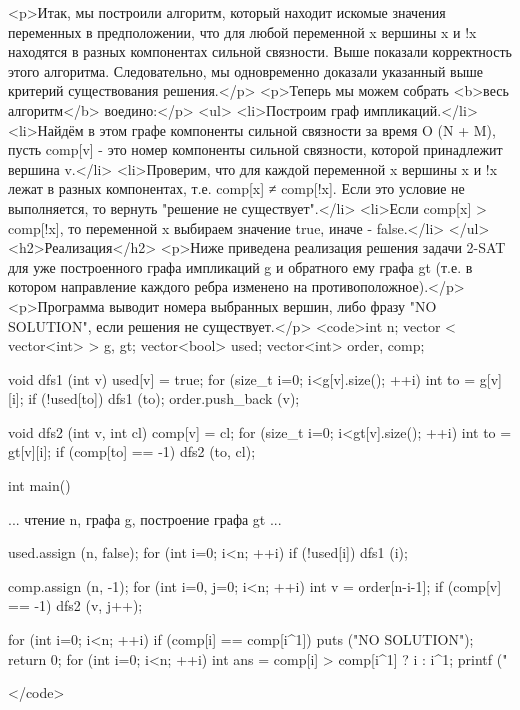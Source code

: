 <p>Итак, мы построили алгоритм, который находит искомые значения переменных в предположении, что для любой переменной x вершины x и !x находятся в разных компонентах сильной связности. Выше показали корректность этого алгоритма. Следовательно, мы одновременно доказали указанный выше критерий существования решения.</p>
<p>Теперь мы можем собрать <b>весь алгоритм</b> воедино:</p>
<ul>
<li>Построим граф импликаций.</li>
<li>Найдём в этом графе компоненты сильной связности за время O (N + M), пусть comp[v] - это номер компоненты сильной связности, которой принадлежит вершина v.</li>
<li>Проверим, что для каждой переменной x вершины x и !x лежат в разных компонентах, т.е. comp[x] ≠ comp[!x]. Если это условие не выполняется, то вернуть "решение не существует".</li>
<li>Если comp[x] > comp[!x], то переменной x выбираем значение true, иначе - false.</li>
</ul>
<h2>Реализация</h2>
<p>Ниже приведена реализация решения задачи 2-SAT для уже построенного графа импликаций g и обратного ему графа gt (т.е. в котором направление каждого ребра изменено на противоположное).</p>
<p>Программа выводит номера выбранных вершин, либо фразу "NO SOLUTION", если решения не существует.</p>
<code>int n;
vector < vector<int> > g, gt;
vector<bool> used;
vector<int> order, comp;

void dfs1 (int v) {
	used[v] = true;
	for (size_t i=0; i<g[v].size(); ++i) {
		int to = g[v][i];
		if (!used[to])
			dfs1 (to);
	}
	order.push_back (v);
}

void dfs2 (int v, int cl) {
	comp[v] = cl;
	for (size_t i=0; i<gt[v].size(); ++i) {
		int to = gt[v][i];
		if (comp[to] == -1)
			dfs2 (to, cl);
	}
}

int main() {
	... чтение n, графа g, построение графа gt ...

	used.assign (n, false);
	for (int i=0; i<n; ++i)
		if (!used[i])
			dfs1 (i);

	comp.assign (n, -1);
	for (int i=0, j=0; i<n; ++i) {
		int v = order[n-i-1];
		if (comp[v] == -1)
			dfs2 (v, j++);
	}

	for (int i=0; i<n; ++i)
		if (comp[i] == comp[i^1]) {
			puts ("NO SOLUTION");
			return 0;
		}
	for (int i=0; i<n; ++i) {
		int ans = comp[i] > comp[i^1] ? i : i^1;
		printf ("%
	}

}</code>
